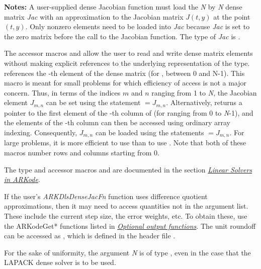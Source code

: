 \documentclass[letterpaper,10pt,english]{sphinxmanual}
\begin{document}
\begin{fulllineitems}
\textbf{Notes:} A user-supplied dense Jacobian function must load the
\emph{N} by \emph{N} dense matrix \emph{Jac} with an approximation to the Jacobian
matrix $J(t,y)$ at the point $(t,y)$. Only nonzero
elements need to be loaded into \emph{Jac} because \emph{Jac} is set to
the zero matrix before the call to the Jacobian function. The type
of \emph{Jac} is .

The accessor macros  and  allow the user
to read and write dense matrix elements without making explicit
references to the underlying representation of the 
type.  references the -th element of
the dense matrix  (for ,  between 0 and
N-1). This macro is meant for small problems for which
efficiency of access is not a major concern. Thus, in terms of the
indices $m$ and $n$ ranging from 1 to \emph{N}, the
Jacobian element $J_{m,n}$ can be set using the statement
 $= J_{m,n}$. Alternatively,
 returns a pointer to the first element of the
-th column of  (for  ranging from 0 to \emph{N}-1),
and the elements of the -th column can then be accessed using
ordinary array indexing. Consequently, $J_{m,n}$ can be
loaded using the statements  $= J_{m,n}$. For large problems, it is more
efficient to use  than to use . Note
that both of these macros number rows and columns starting from 0.

The  type and accessor macros  and
 are documented in the section {\hyperref[linear_solvers/index:linearsolvers]{\emph{Linear Solvers in ARKode}}}.

If the user's \emph{ARKDlsDenseJacFn} function uses difference quotient
approximations, then it may need to access quantities not in the
argument list. These include the current step size, the error
weights, etc.  To obtain these, use the ARKodeGet* functions
listed in {\hyperref[c_interface/User_callable:cinterface-optionaloutputs]{\emph{Optional output functions}}}. The unit roundoff
can be accessed as , which is defined in the
header file .

For the sake of uniformity, the argument \emph{N} is of type ,
even in the case that the LAPACK dense solver is to be used.

\end{fulllineitems}
\end{document}
